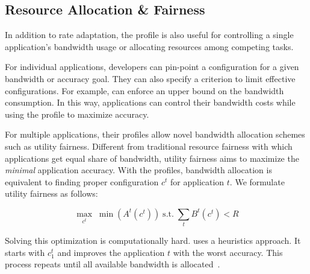 \subsection{Resource Allocation \& Fairness}

In addition to rate adaptation, the profile is also useful for controlling a
single application's bandwidth usage or allocating resources among competing
tasks.

For individual applications, developers can pin-point a configuration for a
given bandwidth or accuracy goal. They can also specify a criterion to limit
effective configurations. For example, \sysname{} can enforce an upper bound on
the bandwidth consumption. In this way, applications can control their bandwidth
costs while using the profile to maximize accuracy.

For multiple applications, their profiles allow novel bandwidth allocation
schemes such as utility fairness. Different from traditional resource fairness
with which applications get equal share of bandwidth, utility fairness aims to
maximize the \textit{minimal} application accuracy. With the profiles, bandwidth
allocation is equivalent to finding proper configuration $c^t$ for application
$t$. We formulate utility fairness as follows:


\begin{equation}
 \label{eq:multitask}
 \underset{c^t}{\max} \; \min({A^t(c^t)})
 \;
 \text{s.t.}
 \;
 \sum_t{B^t(c^t)} < R
\end{equation}


Solving this optimization is computationally hard. \sysname{} uses a heuristics
approach. It starts with $c^t_1$ and improves the application $t$ with the worst
accuracy. This process repeats until all available bandwidth is
allocated~\cite{zhang2017live}.

